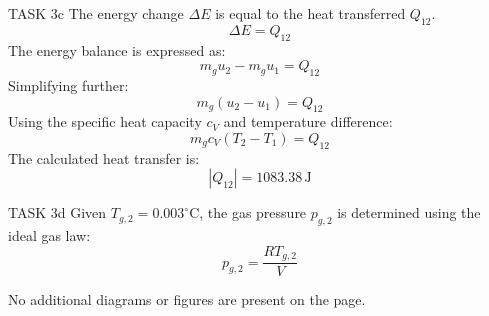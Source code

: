 TASK 3c  
The energy change \( \Delta E \) is equal to the heat transferred \( Q_{12} \).  
\[
\Delta E = Q_{12}
\]  
The energy balance is expressed as:  
\[
m_g u_2 - m_g u_1 = Q_{12}
\]  
Simplifying further:  
\[
m_g (u_2 - u_1) = Q_{12}
\]  
Using the specific heat capacity \( c_V \) and temperature difference:  
\[
m_g c_V (T_2 - T_1) = Q_{12}
\]  
The calculated heat transfer is:  
\[
|Q_{12}| = 1083.38 \, \text{J}
\]  

TASK 3d  
Given \( T_{g,2} = 0.003^\circ\text{C} \), the gas pressure \( p_{g,2} \) is determined using the ideal gas law:  
\[
p_{g,2} = \frac{R T_{g,2}}{V}
\]  

No additional diagrams or figures are present on the page.